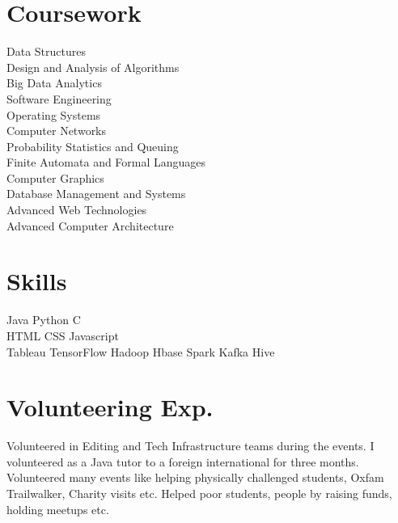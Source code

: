 \documentclass[]{deedy-resume-openfont}
\begin{document}
\begin{minipage}[t]{0.33\textwidth}
\section{Coursework}
Data Structures\\
Design and Analysis of Algorithms \\ 
Big Data Analytics \\
Software Engineering \\
Operating Systems \\
Computer Networks\\
Probability Statistics and Queuing\\
Finite Automata and Formal Languages \\
Computer Graphics\\ 
Database Management and Systems \\ 
Advanced Web Technologies \\
Advanced Computer Architecture\\
\sectionsep


\section{Skills}
Java \textbullet{}  Python \textbullet{} C  \\ 
HTML \textbullet{} CSS \textbullet{} Javascript  \\
Tableau \textbullet{}TensorFlow  \textbullet{} Hadoop
\textbullet{}Hbase
\textbullet{}Spark
\textbullet{}Kafka
\textbullet{}Hive
\sectionsep

%
%

\section{Volunteering Exp.}
\textbullet{}Volunteered in Editing and Tech Infrastructure teams during the events. \linebreak 
{}
\textbullet{}I volunteered as a Java tutor to a foreign international for three months. \linebreak
{} 
\textbullet{}Volunteered many events like helping physically challenged students, Oxfam Trailwalker, Charity visits etc. \linebreak 
{}  
\textbullet{}Helped poor students, people by raising funds, holding meetups etc.


\sectionsep


\end{minipage} 
\end{document}
